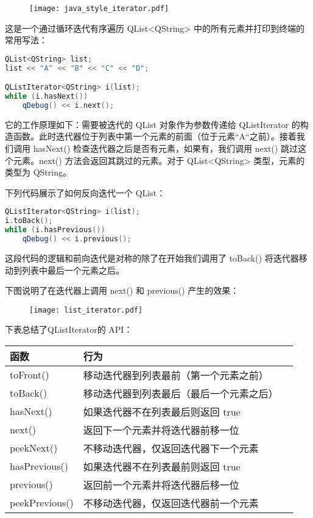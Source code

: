 \begin{figure}[hbt!]  
	\centering
    \texttt{[image: java\_style\_iterator.pdf]}
\end{figure}

这是一个通过循环迭代有序遍历 QList<QString> 中的所有元素并打印到终端的
常用写法：

\begin{lstlisting}[language=C++]
QList<QString> list;
list << "A" << "B" << "C" << "D";

QListIterator<QString> i(list);
while (i.hasNext())
    qDebug() << i.next();

\end{lstlisting}

它的工作原理如下：需要被迭代的 QList 对象作为参数传递给 QListIterator 的构造函数。此时迭代器位于列表中第一个元素的前面（位于元素“A“之前）。接着我们调用 hasNext() 检查迭代器之后是否有元素，如果有，我们调用 next() 跳过这个元素。next() 方法会返回其跳过的元素。对于 QList<QString> 类型，元素的类型为 QString。

下列代码展示了如何反向迭代一个 QList：

\begin{lstlisting}[language=C++]
QListIterator<QString> i(list);
i.toBack();
while (i.hasPrevious())
    qDebug() << i.previous();

\end{lstlisting}

这段代码的逻辑和前向迭代是对称的除了在开始我们调用了 toBack() 将迭代器移动到列表中最后一个元素之后。

下图说明了在迭代器上调用 next() 和 previous() 产生的效果：

\begin{figure}[hbt!]  
	\centering
    \texttt{[image: list\_iterator.pdf]}
\end{figure}

下表总结了QListIterator的 API：

\begin{tabular}{|l|l|l|}
\hline
函数&	行为\\
\hline
toFront()&	移动迭代器到列表最前（第一个元素之前）\\
\hline
toBack()&	移动迭代器到列表最后（最后一个元素之后）\\
\hline
hasNext()&	如果迭代器不在列表最后则返回 true\\
\hline
next()&	返回下一个元素并将迭代器前移一位\\
\hline
peekNext()&	不移动迭代器，仅返回迭代器下一个元素\\
\hline
hasPrevious()&	如果迭代器不在列表最前则返回 true\\
\hline
previous()&	返回前一个元素并将迭代器后移一位\\
\hline
peekPrevious()&	不移动迭代器，仅返回迭代器前一个元素\\
\hline
\end{tabular}

